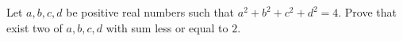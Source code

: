 Let $a,b,c,d$ be positive real numbers such that  $a^2+b^2+c^2+d^2=4$.
Prove that exist two of  $a,b,c,d$ with sum less or equal to $2$.